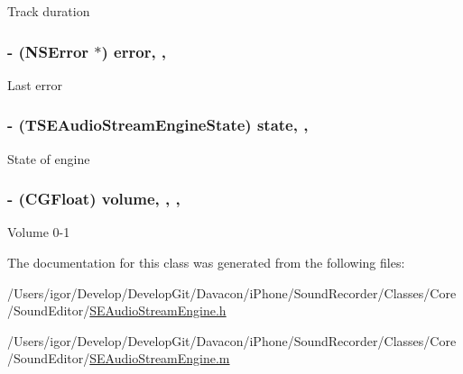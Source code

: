 Track duration \hypertarget{interface_s_e_audio_stream_engine_a698b085efa2bb9de2fd2c24e98bf33cf}{
\subsubsection[{error}]{\setlength{\rightskip}{0pt plus 5cm}-\/ (N\-S\-Error $\ast$) error\hspace{0.3cm}{\ttfamily [read]}, {\ttfamily [nonatomic]}, {\ttfamily [assign]}}}\label{interface_s_e_audio_stream_engine_a698b085efa2bb9de2fd2c24e98bf33cf}
Last error \hypertarget{interface_s_e_audio_stream_engine_a124d47656b0b46ef4ec62ead90d17c47}{
\subsubsection[{state}]{\setlength{\rightskip}{0pt plus 5cm}-\/ ({\bf T\-S\-E\-Audio\-Stream\-Engine\-State}) state\hspace{0.3cm}{\ttfamily [read]}, {\ttfamily [nonatomic]}, {\ttfamily [assign]}}}\label{interface_s_e_audio_stream_engine_a124d47656b0b46ef4ec62ead90d17c47}
State of engine \hypertarget{interface_s_e_audio_stream_engine_aaddfc5a5f1cff2b0136665bc52e89ab1}{
\subsubsection[{volume}]{\setlength{\rightskip}{0pt plus 5cm}-\/ (C\-G\-Float) volume\hspace{0.3cm}{\ttfamily [read]}, {\ttfamily [write]}, {\ttfamily [nonatomic]}, {\ttfamily [assign]}}}\label{interface_s_e_audio_stream_engine_aaddfc5a5f1cff2b0136665bc52e89ab1}
Volume 0-\/1 

The documentation for this class was generated from the following files\-:\begin{DoxyCompactItemize}
\item 
/\-Users/igor/\-Develop/\-Develop\-Git/\-Davacon/i\-Phone/\-Sound\-Recorder/\-Classes/\-Core/\-Sound\-Editor/\hyperlink{_s_e_audio_stream_engine_8h}{S\-E\-Audio\-Stream\-Engine.\-h}\item 
/\-Users/igor/\-Develop/\-Develop\-Git/\-Davacon/i\-Phone/\-Sound\-Recorder/\-Classes/\-Core/\-Sound\-Editor/\hyperlink{_s_e_audio_stream_engine_8m}{S\-E\-Audio\-Stream\-Engine.\-m}\end{DoxyCompactItemize}
